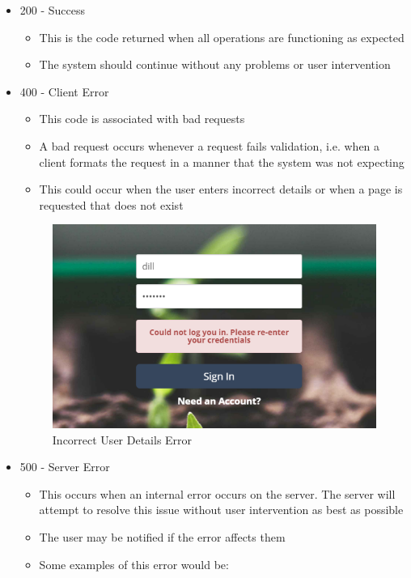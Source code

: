 \documentclass{article}
\begin{document}
	\begin{itemize}
		\item 200 - Success
			\begin{itemize}
				\item This is the code returned when all operations are functioning as expected
				\item The system should continue without any problems or user intervention
			\end{itemize}
		\item 400 - Client Error
			\begin{itemize}
				\item This code is associated with bad requests
				\item A bad request occurs whenever a request fails validation, i.e. when a client formats the request in a manner that the system was not expecting
				\item This could occur when the user enters incorrect details or when a page is requested that does not exist
			\end{itemize}
			\begin{figure}[H]
				\includegraphics[width=\textwidth]{../images/UserManual/400error.png}
				\caption{Incorrect User Details Error}
			\end{figure}
		\item 500 - Server Error
			\begin{itemize}
				\item This occurs when an internal error occurs on the server. The server will attempt to resolve this issue without user intervention as best as possible
				\item The user may be notified if the error affects them
				\item Some examples of this error would be:

\end{itemize}
\end{itemize}
\end{document}
